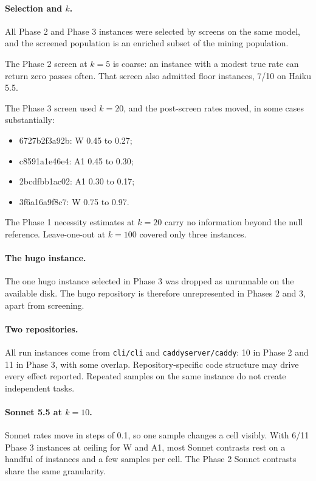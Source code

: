 \paragraph{Selection and $k$.} All Phase 2 and Phase 3 instances were selected by screens on the same model, and the screened population is an enriched subset of the mining population.

The Phase 2 screen at $k=5$ is coarse: an instance with a modest true rate can return zero passes often. That screen also admitted floor instances, 7/10 on Haiku 5.5.

The Phase 3 screen used $k=20$, and the post-screen rates moved, in some cases substantially:
\begin{itemize}
\item 6727b2f3a92b: W 0.45 to 0.27;
\item c8591a1e46e4: A1 0.45 to 0.30;
\item 2bcdfbb1ac02: A1 0.30 to 0.17;
\item 3f6a16a9f8c7: W 0.75 to 0.97.
\end{itemize}

The Phase 1 necessity estimates at $k=20$ carry no information beyond the null reference. Leave-one-out at $k=100$ covered only three instances.

\paragraph{The hugo instance.} The one hugo instance selected in Phase 3 was dropped as unrunnable on the available disk. The hugo repository is therefore unrepresented in Phases 2 and 3, apart from screening.

\paragraph{Two repositories.} All run instances come from \texttt{cli/cli} and \texttt{caddyserver/caddy}: 10 in Phase 2 and 11 in Phase 3, with some overlap. Repository-specific code structure may drive every effect reported. Repeated samples on the same instance do not create independent tasks.

\paragraph{Sonnet 5.5 at $k=10$.} Sonnet rates move in steps of 0.1, so one sample changes a cell visibly. With 6/11 Phase 3 instances at ceiling for W and A1, most Sonnet contrasts rest on a handful of instances and a few samples per cell. The Phase 2 Sonnet contrasts share the same granularity.


